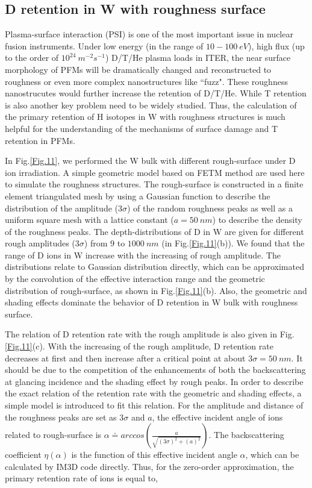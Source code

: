 \subsection{D retention in W with roughness surface}

Plasma-surface interaction (PSI) is one of the most important issue in nuclear fusion instruments. Under low energy (in the range of $10 - 100~eV$), high flux (up to the order of $10^{24}~m^{-2}s^{-1}$) D/T/He plasma loads in ITER\cite{Wirth:2014}, the near surface morphology of PFMs will be dramatically changed and reconstructed to roughness or even more complex nanostructures like ``fuzz". These roughness nanostrucutes would further increase the retention of D/T/He. While T retention is also another key problem need to be widely studied. Thus, the calculation of the primary retention of H isotopes in W with roughness structures is much helpful for the understanding of the mechanisms of surface damage and T retention in PFMs.

In Fig.\ref{Fig.11}, we performed the W bulk with different rough-surface under D ion irradiation. A simple geometric model based on FETM method are used here to simulate the roughness structures\cite{Li:2008}. The rough-surface is constructed in a finite element triangulated mesh by using a Gaussian function to describe the distribution of the amplitude ($3 \sigma$) of the random roughness peaks as well as a uniform square mesh with a lattice constant ($a = 50 ~nm$) to describe the density of the roughness peaks. The depth-distributions of D in W are given for different rough amplitudes ($3 \sigma$) from $9$ to $1000~nm$ (in Fig.\ref{Fig.11}(b)). We found that the range of D ions in W increase with the increasing of rough amplitude. The distributions relate to Gaussian distribution directly, which can be approximated by the convolution of the effective interaction range and the geometric distribution of rough-surface, as shown in Fig.\ref{Fig.11}(b). Also, the geometric and shading effects dominate the behavior of D retention in W bulk with roughness surface.

The relation of D retention rate with the rough amplitude is also given in Fig.\ref{Fig.11}(c). With the increasing of the rough amplitude, D retention rate decreases at first and then increase after a critical point at about $3 \sigma = 50~nm$. It should be due to the competition of the enhancements of both the backscattering at glancing incidence and the shading effect by rough peaks. In order to describe the exact relation of the retention rate with the geometric and shading effects, a simple model is introduced to fit this relation. For the amplitude and distance of the roughness peaks are set as $3 \sigma$ and $a$, the effective incident angle of ions related to rough-surface is $\alpha \doteq arccos \left( \frac{a}{\sqrt{\left(3 \sigma \right)^2 + \left( a \right)^2}} \right)$. The backscattering coefficient $\eta \left(\alpha \right)$ is the function of this effective incident angle $\alpha$, which can be calculated by IM3D code directly. Thus, for the zero-order approximation, the primary retention rate of ions is equal to,

